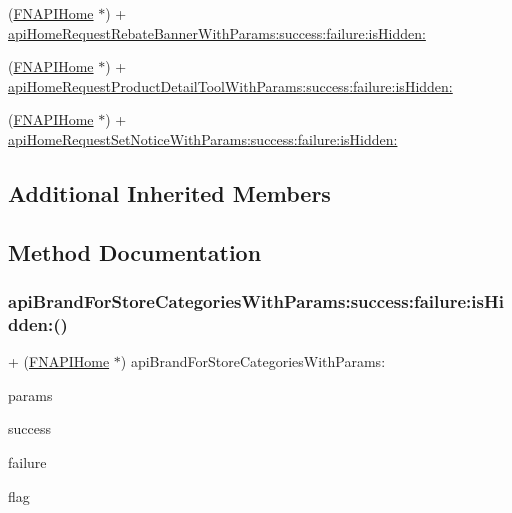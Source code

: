 \begin{DoxyCompactItemize}
\item 
(\mbox{\hyperlink{interface_f_n_a_p_i_home}{F\+N\+A\+P\+I\+Home}} $\ast$) + \mbox{\hyperlink{interface_f_n_a_p_i_home_a700ab8f1f082cb7aded09298bb2bc259}{api\+Home\+Request\+Rebate\+Banner\+With\+Params\+:success\+:failure\+:is\+Hidden\+:}}
\item 
(\mbox{\hyperlink{interface_f_n_a_p_i_home}{F\+N\+A\+P\+I\+Home}} $\ast$) + \mbox{\hyperlink{interface_f_n_a_p_i_home_a2d29918cadfc5d6ef12944ad12d74b48}{api\+Home\+Request\+Product\+Detail\+Tool\+With\+Params\+:success\+:failure\+:is\+Hidden\+:}}
\item 
(\mbox{\hyperlink{interface_f_n_a_p_i_home}{F\+N\+A\+P\+I\+Home}} $\ast$) + \mbox{\hyperlink{interface_f_n_a_p_i_home_a3103f51441e15877a49908cd936d887a}{api\+Home\+Request\+Set\+Notice\+With\+Params\+:success\+:failure\+:is\+Hidden\+:}}
\end{DoxyCompactItemize}
\subsection*{Additional Inherited Members}


\subsection{Method Documentation}
\mbox{\label{interface_f_n_a_p_i_home_ac866c669ca33d24a794142df09fb9ee2}} 
\subsubsection{\texorpdfstring{api\+Brand\+For\+Store\+Categories\+With\+Params\+:success\+:failure\+:is\+Hidden\+:()}{apiBrandForStoreCategoriesWithParams:success:failure:isHidden:()}}
{\footnotesize\ttfamily + (\mbox{\hyperlink{interface_f_n_a_p_i_home}{F\+N\+A\+P\+I\+Home}} $\ast$) api\+Brand\+For\+Store\+Categories\+With\+Params\+: \begin{DoxyParamCaption}\item[{(N\+S\+Mutable\+Dictionary$\ast$)}]{params }\item[{success:(Request\+Success)}]{success }\item[{failure:(Request\+Failure)}]{failure }\item[{isHidden:(B\+O\+OL)}]{flag }\end{DoxyParamCaption}}

